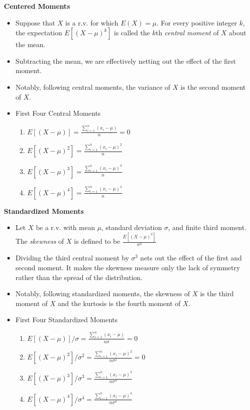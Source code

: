 \documentclass[11pt]{article}
\begin{document}
\textbf{Centered Moments}
\begin{itemize}
    \item Suppose that $X$ is a r.v. for which $E(X)=\mu$. For every positive integer $k$, the 
    expectation $E[{(X-\mu)}^k]$ is called the $k$th \textit{central moment} of $X$ about the 
    mean.
    \item Subtracting the mean, we are effectively netting out the effect of the first moment.
    \item Notably, following central moments, the variance of $X$ is the second moment of $X$.
    \item First Four Central Moments
    \begin{enumerate}
        \item $E[(X-\mu)]=\frac{\sum_{i=1}^{n} (x_i-\mu)}{n}=0$
        \item $E[{(X-\mu)}^2]=\frac{\sum_{i=1}^{n} {(x_i-\mu)}^2}{n}$
        \item $E[{(X-\mu)}^3]=\frac{\sum_{i=1}^{n} {(x_i-\mu)}^3}{n}$
        \item $E[{(X-\mu)}^4]=\frac{\sum_{i=1}^{n} {(x_i-\mu)}^4}{n}$
    \end{enumerate}
\end{itemize}

\textbf{Standardized Moments}
\begin{itemize}
    \item Let $X$ be a r.v. with mean $\mu$, standard deviation $\sigma$, and finite third 
    moment. The \textit{skewness} of $X$  is defined to be $\frac{E[{(X-\mu)}^3]}{\sigma^3}$
    \item Dividing the third central moment by $\sigma^3$ nets out the effect of the first and 
    second moment. It makes the skewness measure only the lack of symmetry rather than the 
    spread of the distribution. 
    \item Notably, following standardized moments, the skewness of $X$ is the third moment of 
    $X$ and the kurtosis is the fourth moment of $X$.
    \item First Four Standardized Moments
    \begin{enumerate}
        \item $E[(X-\mu)]/\sigma=\frac{\sum_{i=1}^{n} (x_i-\mu)}{n\sigma}=0$
        \item $E[{(X-\mu)}^2]/\sigma^2=\frac{\sum_{i=1}^{n} {(x_i-\mu)}^2}{n\sigma^2}=0$
        \item $E[{(X-\mu)}^3]/\sigma^3=\frac{\sum_{i=1}^{n} {(x_i-\mu)}^3}{n\sigma^3}$
        \item $E[{(X-\mu)}^4]/\sigma^4=\frac{\sum_{i=1}^{n} {(x_i-\mu)}^4}{n\sigma^4}$
    \end{enumerate}
\end{itemize}
\end{document}
